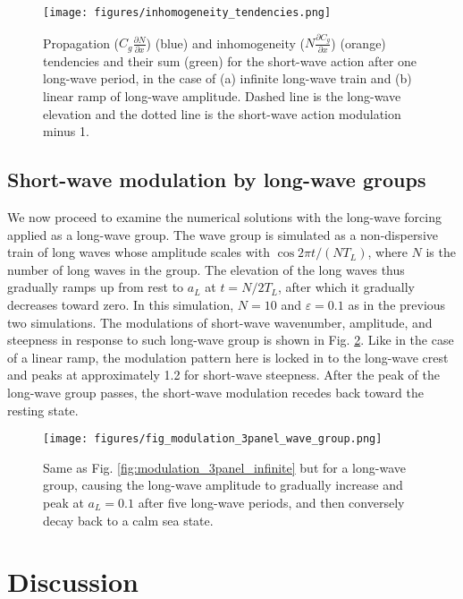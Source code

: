 \documentclass[lineno]{jfm}
\begin{document}
\begin{figure}
  \centering
  \texttt{[image: figures/inhomogeneity\_tendencies.png]}
  \caption{
    Propagation ($C_g \frac{\partial N}{\partial x}$) (blue) and inhomogeneity
    ($N \frac{\partial C_g}{\partial x}$) (orange) tendencies and their sum
    (green) for the short-wave action after one long-wave period, in the case of
    (a) infinite long-wave train and (b) linear ramp of long-wave amplitude.
    Dashed line is the long-wave elevation and the dotted line is the short-wave
    action modulation minus 1.
  }
  \label{fig:inhomogeneity_tendencies}
\end{figure}

\subsection{Short-wave modulation by long-wave groups}
\label{subsection:wave_groups}

We now proceed to examine the numerical solutions with the long-wave forcing
applied as a long-wave group.
The wave group is simulated as a non-dispersive train of long waves whose
amplitude scales with $\cos{2 \pi t / (N T_L)}$, where $N$ is the number of
long waves in the group.
The elevation of the long waves thus gradually ramps up from rest to $a_L$ at $t = N/2 T_L$, after which it gradually decreases toward zero.
In this simulation, $N = 10$ and $\varepsilon = 0.1$ as in the previous two simulations.
The modulations of short-wave wavenumber, amplitude, and steepness in response to such long-wave group is shown in Fig. \ref{fig:modulation_3panel_groups}.
Like in the case of a linear ramp, the modulation pattern here is locked in to the long-wave crest and peaks at approximately 1.2 for short-wave steepness.
After the peak of the long-wave group passes, the short-wave modulation recedes back toward the resting state.

\begin{figure}
\centering
\texttt{[image: figures/fig\_modulation\_3panel\_wave\_group.png]}
\caption{
  Same as Fig. \ref{fig:modulation_3panel_infinite} but for a long-wave group,
  causing the long-wave amplitude to gradually increase and peak at $a_L = 0.1$
  after five long-wave periods, and then conversely decay back to a calm sea state.
}
\label{fig:modulation_3panel_groups}
\end{figure}

\section{Discussion}
\label{section:discussion}
\end{document}
